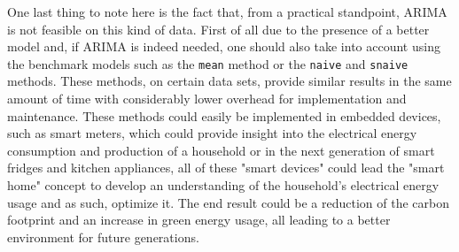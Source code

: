 \documentclass[12pt,a4paper,titlepage]{report}
\begin{document}
One last thing to note here is the fact that, from a practical standpoint, ARIMA is not feasible on this kind of data. First of all due to the presence of a better model and, if ARIMA is indeed needed, one should also take into account using the benchmark models such as the \texttt{mean} method or the \texttt{naive} and \texttt{snaive} methods. These methods, on certain data sets, provide similar results in the same amount of time with considerably lower overhead for implementation and maintenance. These methods could easily be implemented in embedded devices, such as smart meters, which could provide insight into the electrical energy consumption and production of a household or in the next generation of smart fridges and kitchen appliances, all of these "smart devices" could lead the "smart home" concept to develop an understanding of the household's electrical energy usage and as such, optimize it. The end result could be a reduction of the carbon footprint and an increase in green energy usage, all leading to a better environment for future generations.

\newpage



%
%
\end{document}
